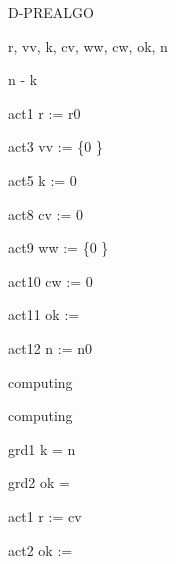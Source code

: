 \documentclass[11pt,a4paper]{article}
\begin{document}
\begin{machine}{D-PREALGO}
  \begin{variables}{r, vv, k, cv, ww, cw, ok, n}
  \end{variables}
  \begin{variant} n - k \end{variant}
  \begin{initialisation}
    \begin{action}{act1} r := r0 \end{action}
    \begin{action}{act3} vv := \{0 \} \end{action}
    \begin{action}{act5} k := 0 \end{action}
    \begin{action}{act8} cv := 0 \end{action}
    \begin{action}{act9} ww := \{0 \} \end{action}
    \begin{action}{act10} cw := 0 \end{action}
    \begin{action}{act11} ok := \False \end{action}
    \begin{action}{act12} n := n0 \end{action}
  \end{initialisation}
  \begin{event}{computing}
    \begin{refines} computing \end{refines}
    \begin{guard}{grd1} k = n \end{guard}
    \begin{guard}{grd2} ok = \False \end{guard}
    \begin{action}{act1} r := cv \end{action}
    \begin{action}{act2} ok := \True \end{action}
  \end{event}

\end{machine}
\end{document}
